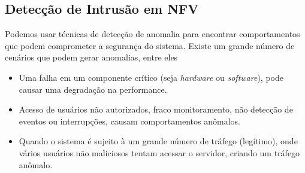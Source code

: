 
\subsection{Detecção de Intrusão em NFV}
\label{ids:nfv}
Podemos usar técnicas de detecção de anomalia para encontrar comportamentos que podem comprometer a segurança do sistema. Existe um grande número de cenários que podem gerar anomalias, entre eles
\begin{itemize}
    \item Uma falha em um componente crítico (seja \textit{hardware} ou \textit{software}), pode causar uma degradação na performance.
    \item Acesso de usuários não autorizados, fraco monitoramento, não detecção de eventos ou interrupções, causam comportamentos anômalos.
    \item Quando o sistema é sujeito à um grande número de tráfego (legítimo), onde vários usuários não maliciosos tentam acessar o servidor, criando um tráfego anômalo.
\end{itemize}




